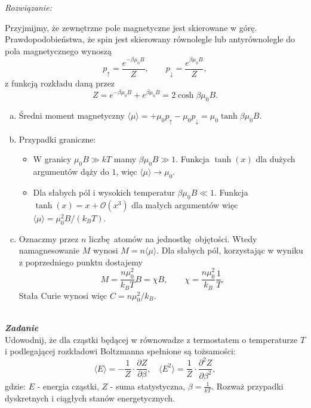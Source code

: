 \documentclass[11pt,a4paper]{article}
\newcounter{zadanie}\newcommand{\zadanie}[1][]{\addtocounter{zadanie}{1} ~\\  {\bf \emph{Zadanie \arabic{zadanie} #1 }} \\}
\begin{document}
{\em Rozwiązanie:}

Przyjmijmy, że zewnętrzne pole magnetyczne jest skierowane w górę. Prawdopodobieństwa, że spin jest skierowany równolegle lub antyrównolegle do pola magnetycznego wynoszą
\begin{equation}
	p_{\uparrow} = \frac{e^{- \beta \mu_0 B}}{Z}, \qquad p_{\downarrow} = \frac{e^{ \beta \mu_0 B}}{Z},
\end{equation}
z funkcją rozkładu daną przez
\begin{equation}
	Z = e^{- \beta \mu_0 B} + e^{ \beta \mu_0 B} = 2 \cosh \beta \mu_0 B.
\end{equation}
\begin{enumerate}[a)]
	\item Średni moment magnetyczny $\langle \mu \rangle = +\mu_0 p_{\uparrow} - \mu_0 p_{\downarrow} = \mu_0 \tanh \beta \mu_0 B$. 
	\item Przypadki graniczne: 
	\begin{itemize}
	\item W granicy $\mu_0 B \gg k T$ mamy $\beta \mu_0 B \gg 1$. Funkcja $\tanh(x)$ dla dużych argumentów dąży do $1$, więc $\langle \mu \rangle \rightarrow \mu_0$.
	\item Dla słabych pól i wysokich temperatur $\beta \mu_0 B \ll 1$. Funkcja $\tanh(x) = x + \mathcal{O}(x^3)$ dla małych argumentów więc $\langle \mu \rangle = \mu_0^2 B / (k_B T)$.
	\end{itemize}
	\item Oznaczmy przez $n$ liczbę atomów na jednostkę objętości. Wtedy namagnesowanie $M$ wynosi $M = n \langle \mu \rangle$. Dla słabych pól, korzystając w wyniku z poprzedniego punktu dostajemy
	\begin{equation}
		M = \frac{n \mu_0^2}{k_B T} B = \chi B, \qquad \chi = \frac{n \mu_0^2}{k_B} \frac{1}{T}.
	\end{equation}
	Stała Curie wynosi więc $C = n \mu_0^2/k_B$.
	
\end{enumerate}

\newpage

\zadanie
Udowodnij, że dla cząstki będącej w równowadze z termostatem o temperaturze $T$ i 
podlegającej rozkładowi Boltzmanna spełnione są tożsamości:
\[ \langle E\rangle = - \frac{1}{Z} \cdot \frac{\partial Z}{\partial \beta}, ~~~~
\langle E^2\rangle = \frac{1}{Z} \cdot \frac{\partial^2 Z}{\partial \beta^2}, \]
gdzie: $E$ - energia cząstki, $Z$ - suma statystyczna, $\beta = \frac{1}{k T}$.
Rozważ przypadki dyskretnych i ciągłych stanów energetycznych.
\end{document}

